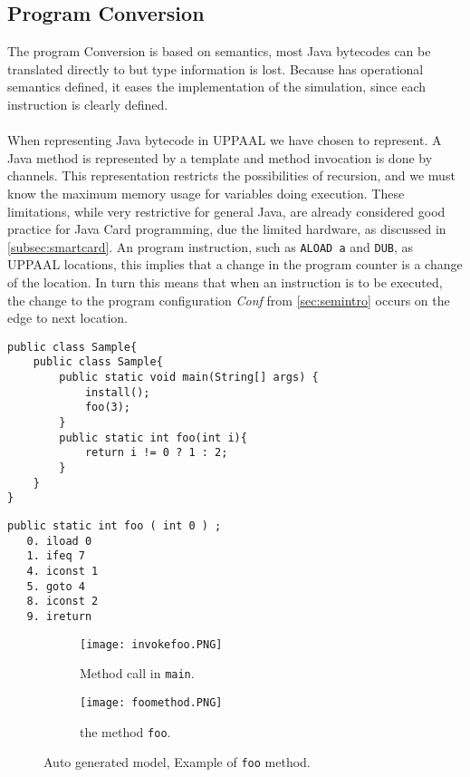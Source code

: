 \subsection{Program Conversion}\label{sec:programConversion}
The program Conversion is based on \jcl semantics, most Java bytecodes can be translated directly to \jcl but type information is lost. Because \jcl has operational semantics defined, it eases the implementation of the simulation, since each instruction is clearly defined.\\\\
When representing Java bytecode in UPPAAL we have chosen to represent. A Java method is represented by a template and method invocation is done by channels. This representation restricts the possibilities of recursion, and we must know the maximum memory usage for variables doing execution.
These limitations, while very restrictive for general Java, are already considered good practice for Java Card programming, due the limited hardware, as discussed in \cref{subsec:smartcard}.
An program instruction, such as \texttt{ALOAD a} and \texttt{DUB}, as UPPAAL locations, this implies that a change in the program counter is a change of the location. 
In turn this means that when an instruction is to be executed, the change to the program configuration \textit{Conf} from  \cref{sec:semintro} occurs on the edge to next location.

\begin{minipage}{\linewidth}
\begin{lstlisting}[caption=Java code sample.]
public class Sample{
    public class Sample{
        public static void main(String[] args) {
            install();
            foo(3);
        }
        public static int foo(int i){
            return i != 0 ? 1 : 2;
        }
    }
}
\end{lstlisting}
\end{minipage}
\begin{minipage}{\linewidth}
\begin{lstlisting}[caption=Bytecode sample.]
public static int foo ( int 0 ) ;
   0. iload 0
   1. ifeq 7
   4. iconst 1
   5. goto 4
   8. iconst 2
   9. ireturn
\end{lstlisting}
\end{minipage}

\begin{figure}
\begin{subfigure}{\textwidth}
	\texttt{[image: invokefoo.PNG]}
	\caption{Method call in \texttt{main}.}
\end{subfigure}
\begin{subfigure}{\textwidth}
	\texttt{[image: foomethod.PNG]}
	\caption{the method \texttt{foo}.}
	\label{fig:uppaal3}
\end{subfigure}

\caption{Auto generated model, Example of \texttt{foo} method.}
\label{fig:fooMethod}
\end{figure}


